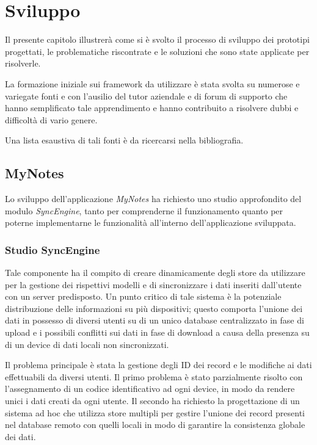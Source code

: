 \chapter{Sviluppo}\label{ch:sviluppo}
Il presente capitolo illustrerà come si è svolto il processo di sviluppo dei prototipi progettati, le problematiche riscontrate e le soluzioni che sono state applicate per risolverle.

La formazione iniziale sui framework da utilizzare è stata svolta su numerose e variegate fonti e con l'ausilio del tutor aziendale e di forum di supporto che hanno semplificato tale apprendimento e hanno contribuito a risolvere dubbi e difficoltà di vario genere.

Una lista esaustiva di tali fonti è da ricercarsi nella bibliografia.

\section{MyNotes}
Lo sviluppo dell'applicazione \emph{MyNotes} ha richiesto uno studio approfondito del modulo \emph{SyncEngine}, tanto per comprenderne il funzionamento quanto per poterne implementarne le funzionalità all'interno dell'applicazione sviluppata.

\subsection{Studio SyncEngine}
Tale componente ha il compito di creare dinamicamente degli store da utilizzare per la gestione dei rispettivi modelli e di sincronizzare i dati inseriti dall'utente con un server predisposto.
Un punto critico di tale sistema è la potenziale distribuzione delle informazioni su più dispositivi; questo comporta l'unione dei dati in possesso di diversi utenti su di un unico database centralizzato in fase di upload e i possibili conflitti sui dati in fase di download a causa della presenza su di un device di dati locali non sincronizzati.

Il problema principale è stata la gestione degli ID dei record e le modifiche ai dati effettuabili da diversi utenti.
Il primo problema è stato parzialmente risolto con l'assegnamento di un codice identificativo ad ogni device, in modo da rendere unici i dati creati da ogni utente.
Il secondo ha richiesto la progettazione di un sistema ad hoc che utilizza store multipli per gestire l'unione dei record presenti nel database remoto con quelli locali in modo di garantire la consistenza globale dei dati.

